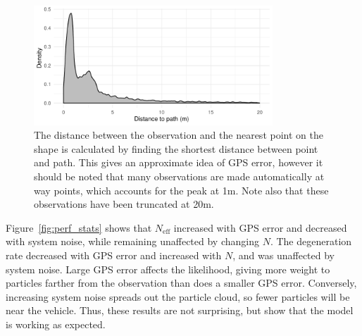 \begin{figure}[tb]
    \centering
    \includegraphics[width=0.8\textwidth]{figures/04_model_results_dist.pdf}
    \caption{
        The distance between the observation and the nearest point on the shape
        is calculated by finding the shortest distance between point and path.
        This gives an approximate idea of GPS error, however it should be noted
        that many observations are made automatically at way points,
        which accounts for the peak at 1m.
        Note also that these observations have been truncated at 20m.
    }
    \label{fig:dist_to_route}
\end{figure}


Figure~\ref{fig:perf_stats} shows that $N_\text{eff}$ increased
with GPS error and decreased with system noise,
while remaining unaffected by changing $N$.
The degeneration rate decreased with GPS error and increased with $N$,
and was unaffected by system noise.
Large GPS error affects the likelihood,
giving more weight to particles farther from the observation
than does a smaller GPS error.
Conversely, increasing system noise spreads out the particle cloud,
so fewer particles will be near the vehicle.
Thus, these results are not surprising, 
but show that the model is working as expected.


